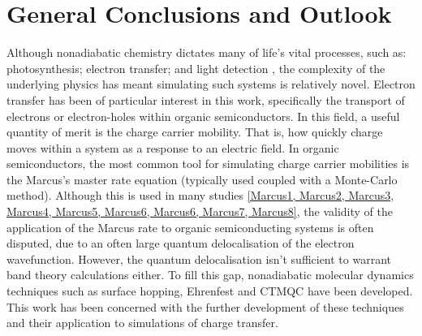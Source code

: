 \chapter{General Conclusions and Outlook}
\label{chap:outlook}
Although nonadiabatic chemistry dictates many of life's vital processes, such as: photosynthesis; electron transfer; and light detection \cite{Dral2018}, the complexity of the underlying physics has meant simulating such systems is relatively novel. Electron transfer has been of particular interest in this work, specifically the transport of electrons or electron-holes within organic semiconductors. In this field, a useful quantity of merit is the charge carrier mobility. That is, how quickly charge moves within a system as a response to an electric field. In organic semiconductors, the most common tool for simulating charge carrier mobilities is the Marcus's master rate equation (typically used coupled with a Monte-Carlo method). Although this is used in many studies \ref{Marcus1, Marcus2, Marcus3, Marcus4, Marcus5, Marcus6, Marcus6, Marcus7, Marcus8}, the validity of the application of the Marcus rate to organic semiconducting systems is often disputed, due to an often large quantum delocalisation of the electron wavefunction. However, the quantum delocalisation isn't sufficient to warrant band theory calculations either. To fill this gap, nonadiabatic molecular dynamics techniques such as surface hopping, Ehrenfest and CTMQC have been developed. This work has been concerned with the further development of these techniques and their application to simulations of charge transfer.
\\\\
